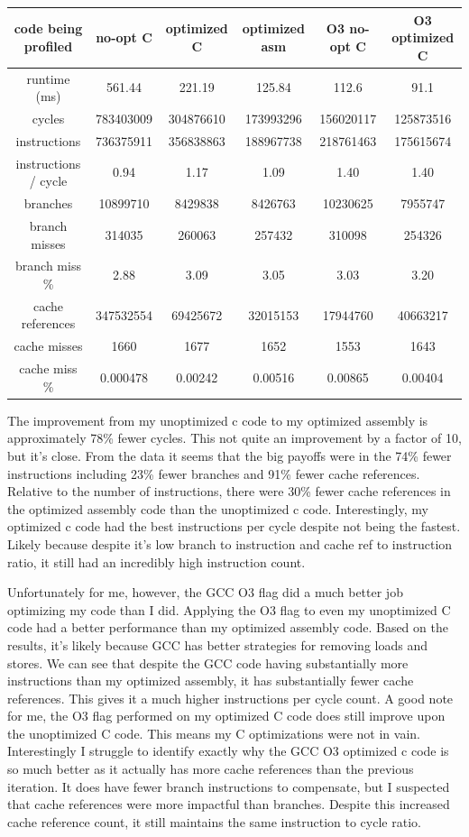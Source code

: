 \documentclass[12pt]{article}
\begin{document}
\begingroup
     \footnotesize
     \begin{tabular}{|c|ccc|cc|}
     \hline
     code being profiled & no-opt C & optimized C & optimized asm & O3 no-opt C & O3 optimized C\\
     \hline
     runtime (ms) &  561.44 & 221.19 & 125.84 & 112.6 & 91.1\\
     cycles & 783403009 & 304876610 & 173993296 & 156020117 & 125873516\\ 
     instructions & 736375911 & 356838863 & 188967738 & 218761463 & 175615674\\
     instructions / cycle & 0.94 & 1.17 & 1.09 & 1.40 & 1.40\\
     branches & 10899710 & 8429838 & 8426763 & 10230625 & 7955747\\
     branch misses & 314035 & 260063 & 257432 & 310098 & 254326\\
     branch miss \% & 2.88 & 3.09 & 3.05 & 3.03 & 3.20\\
     cache references & 347532554 & 69425672 & 32015153 & 17944760 & 40663217\\
     cache misses & 1660 & 1677 & 1652 & 1553 & 1643\\
     cache miss \% &  0.000478 & 0.00242 & 0.00516 & 0.00865 & 0.00404\\
     \hline 
    \end{tabular}
\endgroup
   



The improvement from my unoptimized c code to my optimized assembly is approximately 78\% fewer cycles. This not quite an improvement by a factor of 10, but it's close. From the data it seems that the big payoffs were in the 74\% fewer instructions including 23\% fewer branches and 91\% fewer cache references. Relative to the number of instructions, there were 30\% fewer cache references in the optimized assembly code than the unoptimized c code. Interestingly, my optimized c code had the best instructions per cycle despite not being the fastest. Likely because despite it's low branch to instruction and cache ref to instruction ratio, it still had an incredibly high instruction count.

Unfortunately for me, however, the GCC O3 flag did a much better job optimizing my code than I did. Applying the O3 flag to even my unoptimized C code had a better performance than my optimized assembly code. Based on the results, it's likely because GCC has better strategies for removing loads and stores. We can see that despite the GCC code having substantially more instructions than my optimized assembly, it has substantially fewer cache references. This gives it a much higher instructions per cycle count. A good note for me, the O3 flag performed on my optimized C code does still improve upon the unoptimized C code. This means my C optimizations were not in vain. Interestingly I struggle to identify exactly why the GCC O3 optimized c code is so much better as it actually has more cache references than the previous iteration. It does have fewer branch instructions to compensate, but I suspected that cache references were more impactful than branches. Despite this increased cache reference count, it still maintains the same instruction to cycle ratio.
\end{document}
